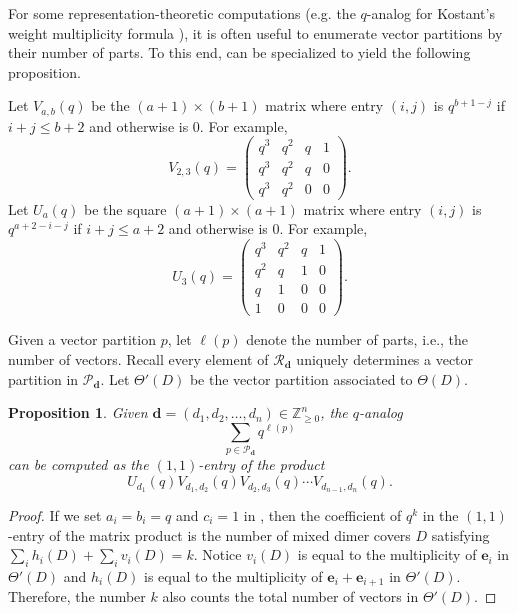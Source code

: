 \documentclass{amsart}
\def\PP{\mathcal{P}}
\def\bfd{{\mathbf{d}}}
\newtheorem{proposition}[theorem]{Proposition}
\theoremstyle{definition}
\begin{document}
For some representation-theoretic computations 
(e.g. the $q$-analog for Kostant's weight multiplicity formula \cite[Proposition 9.2]{Lusztig}), it is often useful
to enumerate vector partitions by their number of parts.
To this end, \cite[Theorem 2]{ClaussenOvenhouse} can be
specialized to yield the following
proposition. 

Let $V_{a,b}(q)$ be the $(a+1)\times(b+1)$ matrix where
entry $(i,j)$ is $q^{b+1-j}$ if $i+j\leq b+2$ and
otherwise is $0$. For example,
\[V_{2,3}(q)=\begin{pmatrix}
    q^3 & q^2 & q & 1\\
    q^3 & q^2 & q & 0 \\
    q^3 & q^2 & 0 &0
\end{pmatrix}.\]
Let $U_a(q)$ be the square $(a+1)\times(a+1)$ matrix
where entry $(i,j)$ is $q^{a+2-i-j}$ if $i+j\leq a+2$
and otherwise is 0. For example,
\[U_3(q)=\begin{pmatrix}
    q^3 & q^2 & q & 1\\
    q^2 & q & 1 & 0 \\
    q & 1 & 0 & 0\\
    1 & 0 & 0 & 0
\end{pmatrix}.\]

Given a vector partition $p$, let $\ell(p)$ denote the number of parts, i.e., the number of vectors. Recall every element of $\mathcal{R}_\mathbf{d}$ uniquely determines a vector partition in $\mathcal{P}_\mathbf{d}$. Let $\Theta'(D)$ be the vector partition associated to $\Theta(D)$. 

\begin{proposition}\label{prop:qAnalog}
    Given $\mathbf{d} = (d_1,d_2,\ldots,d_n) \in \mathbb{Z}_{\ge 0}^n$, the $q$-analog
    \[\sum_{p\in \PP_\bfd} q^{\ell(p)}\]
    can be computed as the $(1,1)$-entry of
    the product
    \[U_{d_1}(q)V_{d_1,d_2}(q)V_{d_2,d_3}(q)\cdots V_{d_{n-1},d_n}(q).\]
\end{proposition}

\begin{proof}
If we set $a_i=b_i=q$ and $c_i=1$ in \cite[Theorem 2]{ClaussenOvenhouse}, then the coefficient of $q^k$ in the $(1,1)$-entry of the matrix product is the number of mixed dimer covers $D$ satisfying $\sum_i h_i(D) + \sum_i v_i(D) = k$. Notice $v_i(D)$ is equal to the multiplicity of $\mathbf{e}_i$ in $\Theta'(D)$ and $h_i(D)$ is equal to the multiplicity of $\mathbf{e}_i+\mathbf{e}_{i+1}$ in $\Theta'(D)$. Therefore, the number $k$ also counts the total number of vectors in $\Theta'(D)$.
\end{proof}
\end{document}
